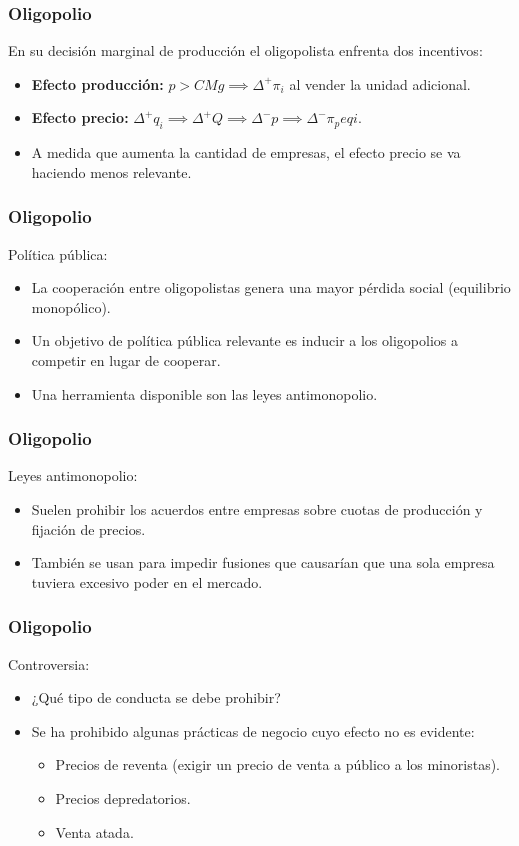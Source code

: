 \documentclass[dvipsnames,table,leqno]{beamer}
\newcommand{\peq}[1]{{\scriptscriptstyle{#1}}}
\begin{document}
		\begin{frame}
			\frametitle{Oligopolio}
			En su decisión marginal de producción el oligopolista enfrenta dos incentivos:
			\begin{itemize}
				\item \textbf{Efecto producción:} $p>CMg\implies\Delta^\peq{+}\pi_\peq{i}$ al vender la unidad adicional.
				\item \textbf{Efecto precio:} $\Delta^\peq{+}q_\peq{i}\implies\Delta^\peq{+}Q\implies\Delta^\peq{-}p\implies\Delta^\peq{-}\pi_peq{i}$.
				\item A medida que aumenta la cantidad de empresas, el efecto precio se va haciendo menos relevante.
			\end{itemize}
		\end{frame}		

		\begin{frame}
			\frametitle{Oligopolio}
			Política pública:
			\begin{itemize}
				\item La cooperación entre oligopolistas genera una mayor pérdida social (equilibrio monopólico).
				\item Un objetivo de política pública relevante es inducir a los oligopolios a competir en lugar de cooperar.
				\item Una herramienta disponible son las leyes antimonopolio.
			\end{itemize}
		\end{frame}		

		\begin{frame}
			\frametitle{Oligopolio}
			Leyes antimonopolio:
			\begin{itemize}
				\item Suelen prohibir los acuerdos entre empresas sobre cuotas de producción y fijación de precios.
				\item También se usan para impedir fusiones que causarían que una sola empresa tuviera excesivo poder en el mercado.
			\end{itemize}
		\end{frame}		

		\begin{frame}
			\frametitle{Oligopolio}
			Controversia:
			\begin{itemize}
				\item ¿Qué tipo de conducta se debe prohibir?
				\item Se ha prohibido algunas prácticas de negocio cuyo efecto no es evidente:
					\begin{itemize}
						\item Precios de reventa (exigir un precio de venta a público a los minoristas).
						\item Precios depredatorios.
						\item Venta atada.
					\end{itemize}
			\end{itemize}
		\end{frame}	
		
\end{document}
